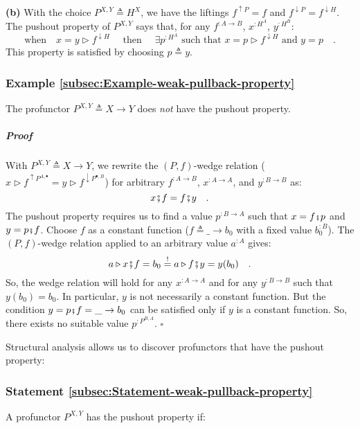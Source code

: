 \textbf{(b)} With the choice $P^{X,Y}\triangleq H^{X}$, we have the
liftings $f^{\uparrow P}=f$ and $f^{\downarrow P}=f^{\downarrow H}$.
The pushout property of $P^{X,Y}$ says that, for any $f^{:A\rightarrow B}$,
$x^{:H^{A}}$, $y^{:H^{B}}$:
\[
\text{when}\quad x=y\triangleright f^{\downarrow H}\quad\text{ then }\quad\exists p^{:H^{A}}\text{ such that }x=p\triangleright f^{\downarrow H}\text{ and }y=p\quad.
\]
This property is satisfied by choosing $p\triangleq y$.

\subsubsection{Example \label{subsec:Example-weak-pullback-property}\ref{subsec:Example-weak-pullback-property}}

The profunctor $P^{X,Y}\triangleq X\rightarrow Y$ does \emph{not}
have the pushout property.

\subparagraph{Proof}

With $P^{X,Y}\triangleq X\rightarrow Y$, we rewrite the $\left(P,f\right)$-wedge
relation ($x\triangleright f^{\uparrow P^{A,\bullet}}=y\triangleright f^{\downarrow P^{\bullet,B}}$)
for arbitrary $f^{:A\rightarrow B}$, $x^{:A\rightarrow A}$, and
$y^{:B\rightarrow B}$ as:
\[
x\bef f=f\bef y\quad.
\]
The pushout property requires us to find a value $p^{:B\rightarrow A}$
such that $x=f\bef p$ and $y=p\bef f$. Choose $f$ as a constant
function ($f\triangleq\_\rightarrow b_{0}$ with a fixed value $b_{0}^{:B}$).
The $\left(P,f\right)$-wedge relation applied to an arbitrary value
$a^{:A}$ gives:
\[
a\triangleright x\bef f=b_{0}\overset{!}{=}a\triangleright f\bef y=y(b_{0})\quad.
\]
So, the wedge relation will hold for any $x^{:A\rightarrow A}$ and
for any $y^{:B\rightarrow B}$ such that $y(b_{0})=b_{0}$. In particular,
$y$ is not necessarily a constant function. But the condition $y=p\bef f=\_\rightarrow b_{0}$
can be satisfied only if $y$ is a constant function. So, there exists
no suitable value $p^{:P^{B,A}}$. $\square$

Structural analysis allows us to discover profunctors that have the
pushout property:

\subsubsection{Statement \label{subsec:Statement-weak-pullback-property}\ref{subsec:Statement-weak-pullback-property}}

A profunctor $P^{X,Y}$ has the pushout property if:


